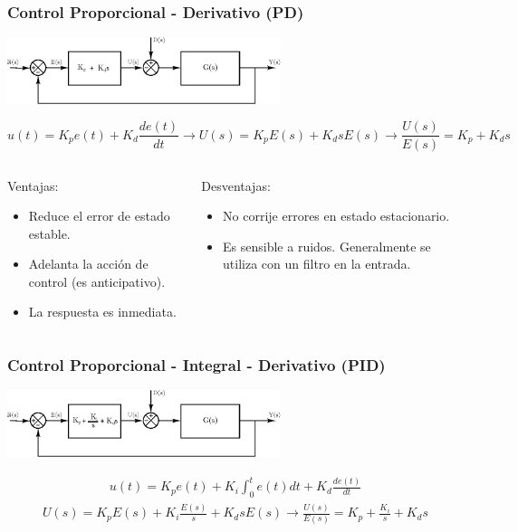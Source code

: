 \documentclass[aspectratio=169,handout]{beamer}
\theoremstyle{definition}
\theoremstyle{plain}
\theoremstyle{remark}
\begin{document}
\begin{frame}[<+->]\frametitle{Control Proporcional - Derivativo (PD)}
\begin{center}
  \includegraphics[width=8cm]{images/PDcontroller.eps}
\end{center}
\pause
\begin{equation*}
  u(t) = K_p e(t) + K_d \frac{de(t)}{dt} \longrightarrow U(s) = K_p E(s) + K_d s E(s) \rightarrow \frac{U(s)}{E(s)} = K_p + K_d s
\end{equation*}
\begin{columns}
\begin{column}{0.5\textwidth}
Ventajas:
\begin{itemize}
  \item Reduce el error de estado estable.
  \item Adelanta la acción de control (es anticipativo).
  \item La respuesta es inmediata.
\end{itemize}
\end{column}
\begin{column}{0.5\textwidth}
Desventajas:
\begin{itemize}
  \item No corrije errores en estado estacionario.
  \item Es sensible a ruidos. Generalmente se utiliza con un filtro en la entrada.
\end{itemize}
\end{column}
\end{columns}
\end{frame}

\begin{frame}[<+->]\frametitle{Control Proporcional - Integral - Derivativo (PID)}
\begin{center}
  \includegraphics[width=8cm]{images/PIDcontroller.eps}
\end{center}
\pause
\begin{align*}
  u(t) = K_p e(t) + K_i \int_0^t e(t) dt + K_d \frac{de(t)}{dt}
\end{align*}
\pause
\begin{align*}
  U(s) = K_p E(s) + K_i \frac{E(s)}{s} + K_d s E(s) \rightarrow \frac{U(s)}{E(s)} = K_p + \frac{K_i}{s} + K_d s
\end{align*}
\end{frame}
\end{document}
